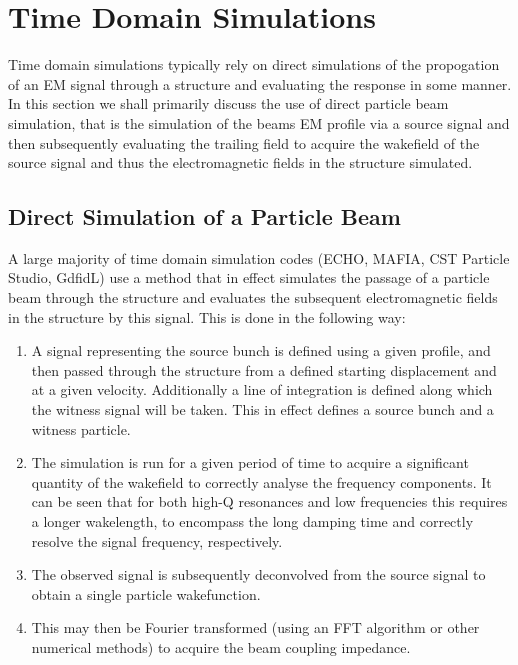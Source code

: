 \section{Time Domain Simulations}

Time domain simulations typically rely on direct simulations of the propogation of an EM signal through a structure and evaluating the response in some manner. In this section we shall primarily discuss the use of direct particle beam simulation, that is the simulation of the beams EM profile via a source signal and then subsequently evaluating the trailing field to acquire the wakefield of the source signal and thus the electromagnetic fields in the structure simulated.

\subsection{Direct Simulation of a Particle Beam}

A large majority of time domain simulation codes (ECHO, MAFIA, CST Particle Studio, GdfidL) use a method that in effect simulates the passage of a particle beam through the structure and evaluates the subsequent electromagnetic fields in the structure by this signal. This is done in the following way:

\begin{enumerate}
\item{A signal representing the source bunch is defined using a given profile, and then passed through the structure from a defined starting displacement and at a given velocity. Additionally a line of integration is defined along which the witness signal will be taken. This in effect defines a source bunch and a witness particle.}
\item{The simulation is run for a given period of time to acquire a significant quantity of the wakefield to correctly analyse the frequency components. It can be seen that for both high-Q resonances and low frequencies this requires a longer wakelength, to encompass the long damping time and correctly resolve the signal frequency, respectively.}
\item{The observed signal is subsequently deconvolved from the source signal to obtain a single particle wakefunction.}
\item{This may then be Fourier transformed (using an FFT algorithm or other numerical methods) to acquire the beam coupling impedance.}
\end{enumerate}

